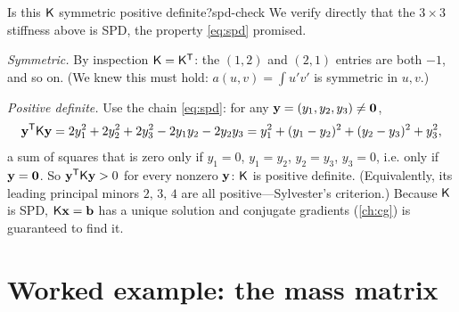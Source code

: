 \begin{workedexample}{Is this $\mathsf{K}$ symmetric positive definite?}{spd-check}
We verify directly that the $3\times3$ stiffness above is SPD, the property
\cref{eq:spd} promised.

\emph{Symmetric.} By inspection $\mathsf{K}=\mathsf{K}^{\mathsf T}$: the
$(1,2)$ and $(2,1)$ entries are both $-1$, and so on. (We knew this must hold:
$a(u,v)=\int u'v'$ is symmetric in $u,v$.)

\emph{Positive definite.} Use the chain \cref{eq:spd}: for any
$\mathbf{y}=(y_1,y_2,y_3)\neq\mathbf 0$,
\[
\mathbf{y}^{\mathsf T}\mathsf{K}\mathbf{y}
=2y_1^2+2y_2^2+2y_3^2-2y_1y_2-2y_2y_3
=y_1^2+(y_1-y_2)^2+(y_2-y_3)^2+y_3^2,
\]
a sum of squares that is zero only if $y_1=0$, $y_1=y_2$, $y_2=y_3$, $y_3=0$, i.e.
only if $\mathbf{y}=\mathbf 0$. So $\mathbf{y}^{\mathsf T}\mathsf{K}\mathbf{y}>0$ for every nonzero $\mathbf{y}$:
$\mathsf{K}$ is positive definite. (Equivalently, its leading principal minors
$2,\,3,\,4$ are all positive---Sylvester's criterion.) Because $\mathsf{K}$ is SPD,
$\mathsf{K}\mathbf{x}=\mathbf{b}$ has a unique solution and conjugate gradients (\cref{ch:cg}) is
guaranteed to find it.
\end{workedexample}

\section{Worked example: the mass matrix}

